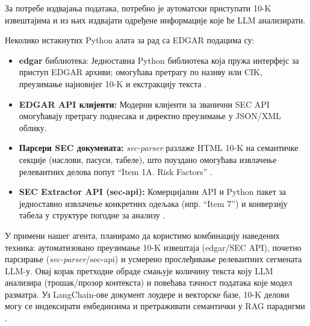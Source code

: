 За потребе издвајања података, потребно је аутоматски приступати 10-K извештајима и из њих издвајати одређене информације које ће LLM анализирати.

Неколико истакнутих Python алата за рад са EDGAR подацима су:
\newline

\begin{itemize}
    \item \textbf{edgar} библиотека: Једноставна Python библиотека која пружа интерфејс за приступ EDGAR архиви; омогућава претрагу по називу или CIK, преузимање најновијег 10-K и екстракцију текста \cite{pypi_edgar_2024}.
    \item \textbf{EDGAR API клијенти:} Модерни клијенти за званични SEC API омогућавају претрагу поднесака и директно преузимање у JSON/XML облику.
    \item \textbf{Парсери SEC докумената:} \textit{sec-parser} разлаже HTML 10-K на семантичке секције (наслови, пасуси, табеле), што поуздано омогућава извлачење релевантних делова попут ``Item 1A. Risk Factors'' \cite{sec_parser_docs_2023}.
    \item \textbf{SEC Extractor API (sec-api):} Комерцијални API и Python пакет за једноставно извлачење конкретних одељака (нпр. ``Item 7'') и конверзију табела у структуре погодне за анализу \cite{sec_api_tutorial_2023}.
\end{itemize}

У примени нашег агента, планирамо да користимо комбинацију наведених техника: аутоматизовано преузимање 10-K извештаја (edgar/SEC API), почетно парсирање (\textit{sec-parser}/sec-api) и усмерено прослеђивање релевантних сегмената LLM-у. Овај корак претходне обраде смањује количину текста коју LLM анализира (трошак/прозор контекста) и повећава тачност података које модел разматра. Уз LangChain-ове документ лоудере и векторске базе, 10-K делови могу се индексирати ембединзима и претраживати семантички у RAG парадигми \cite{ibm_what_is_langchain_2023,patriwala_langchain_2025}.

